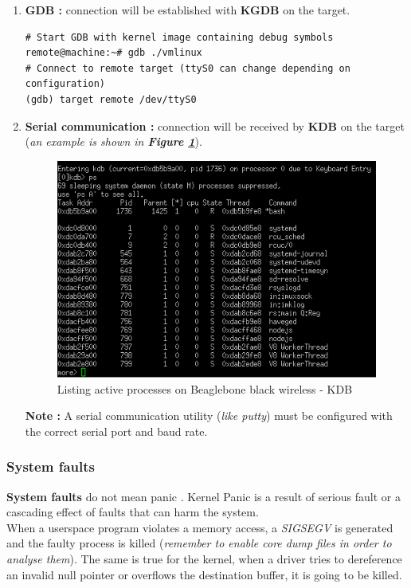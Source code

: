 \begin{enumerate}
	\item \textbf{GDB : } connection will be established with \textbf{KGDB} on the target.
\begin{lstlisting}[style=BashInputStyle]
# Start GDB with kernel image containing debug symbols 
remote@machine:~# gdb ./vmlinux 
# Connect to remote target (ttyS0 can change depending on configuration)
(gdb) target remote /dev/ttyS0
\end{lstlisting}	
	
	
	\item \textbf{Serial communication : } connection will be received by \textbf{KDB} on the target (\textit{an example is shown in \textbf{Figure \ref{Debugging Beaglebone black wireless using KDB}}}).
	
	\begin{figure}[H]
		\centering
        \includegraphics[scale=0.45]{img/solution/kdb-beagle-bone-black.png}
        \caption{Listing active processes on Beaglebone black wireless - KDB}
        \label{Debugging Beaglebone black wireless using KDB}
\end{figure}
	
	\textbf{Note : } A serial communication utility (\textit{like putty}) must be configured with the correct serial port and baud rate.
\end{enumerate}

\subsubsection{System faults}
\textbf{System faults} do not mean \og panic \fg. Kernel Panic is a result of serious fault or a cascading effect of faults that can harm the system.\\
When a userspace program violates a memory access, a \emph{SIGSEGV} is generated and the faulty process is killed (\textit{remember to enable core dump files in order to analyse them}). The same is true for the kernel, when a driver tries to dereference an invalid \og null pointer \fg or overflows the destination buffer, it is going to be killed.\\


